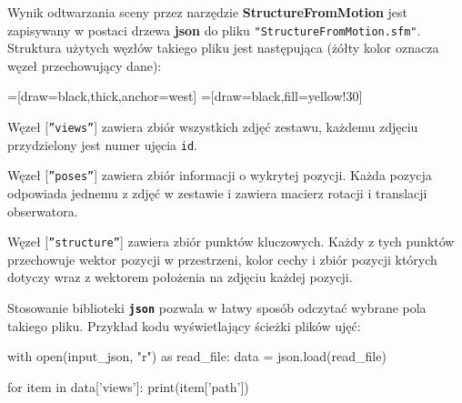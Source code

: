 Wynik odtwarzania sceny przez narzędzie \textbf{StructureFromMotion} jest zapisywany w postaci drzewa \textbf{json} do pliku \texttt{"StructureFromMotion.sfm"}.
Struktura użytych węzłów takiego pliku jest następująca (żółty kolor oznacza węzeł przechowujący dane):

=[draw=black,thick,anchor=west]
=[draw=black,fill=yellow!30]

Węzeł [\texttt{”views”}] zawiera zbiór wszystkich zdjęć zestawu, każdemu zdjęciu przydzielony jest numer ujęcia \texttt{id}.

Węzeł [\texttt{”poses”}] zawiera zbiór informacji o wykrytej pozycji. Każda pozycja odpowiada jednemu z zdjęć w zestawie i zawiera macierz rotacji i translacji obserwatora.

Węzeł [\texttt{”structure”}] zawiera zbiór punktów kluczowych. Każdy z tych punktów przechowuje wektor pozycji w przestrzeni, kolor cechy i zbiór pozycji których dotyczy wraz z wektorem położenia na zdjęciu każdej pozycji.

Stosowanie biblioteki \textbf{\texttt{json}} pozwala w łatwy sposób odczytać wybrane pola takiego pliku.
Przykład kodu wyświetlający ścieżki plików ujęć:

\begin{python}
with open(input_json, "r") as read_file:
   data = json.load(read_file)

   for item in data['views']:
      print(item['path'])
\end{python}

